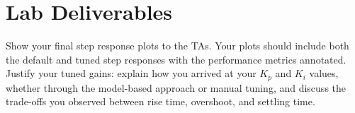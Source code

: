 \documentclass{ol-softwaremanual}
\begin{document}
\section{Lab Deliverables}

Show your final step response plots to the TAs.
Your plots should include both the default and tuned step responses with the
performance metrics annotated.
Justify your tuned gains: explain how you arrived at your $K_p$ and $K_i$ values,
whether through the model-based approach or manual tuning, and discuss the
trade-offs you observed between rise time, overshoot, and settling time.
\end{document}
